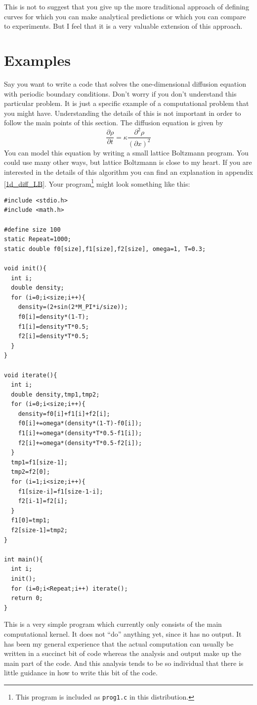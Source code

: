 \documentclass[12pt,letterpaper]{article}
\begin{document}
This is not to suggest that you give up the more traditional approach
of defining curves for which you can make analytical predictions or
which you can compare to experiments. But I feel that it is a very
valuable extension of this approach.

\section{Examples}
Say you want to write a code that solves the one-dimensional diffusion
equation with periodic boundary conditions. Don't worry if you don't
understand this particular problem. It is just a specific example of a
computational problem that you might have. Understanding the details
of this is not important in order to follow the main points of this
section. The diffusion equation is given by
\begin{equation}
\frac{\partial \rho}{\partial t} =
\kappa\frac{\partial^2\rho}{(\partial x)^2}
\end{equation}
You can model this equation by writing a small lattice Boltzmann
program. You could use many other ways, but lattice
Boltzmann is close to my heart. If you are interested in the details
of this algorithm you can find an explanation in appendix
\ref{1d_diff_LB}.  Your program\footnote{This program is included as
\texttt{prog1.c} in this distribution.} might look something like
this:
\begin{verbatim}
#include <stdio.h>
#include <math.h>

#define size 100
static Repeat=1000;
static double f0[size],f1[size],f2[size], omega=1, T=0.3;

void init(){
  int i;
  double density;
  for (i=0;i<size;i++){
    density=(2+sin(2*M_PI*i/size));
    f0[i]=density*(1-T);
    f1[i]=density*T*0.5;
    f2[i]=density*T*0.5;
  }
}

void iterate(){
  int i;
  double density,tmp1,tmp2;
  for (i=0;i<size;i++){
    density=f0[i]+f1[i]+f2[i];
    f0[i]+=omega*(density*(1-T)-f0[i]);
    f1[i]+=omega*(density*T*0.5-f1[i]);
    f2[i]+=omega*(density*T*0.5-f2[i]);
  }
  tmp1=f1[size-1];
  tmp2=f2[0];
  for (i=1;i<size;i++){
    f1[size-i]=f1[size-1-i];
    f2[i-1]=f2[i];
  }
  f1[0]=tmp1;
  f2[size-1]=tmp2;
}

int main(){
  int i;
  init();
  for (i=0;i<Repeat;i++) iterate();
  return 0;
}
\end{verbatim}
This is a very simple program which currently only consists of the
main computational kernel. It does not ``do'' anything yet, since
it has no output. It has been my general experience that the actual
computation can usually be written in a succinct bit of code whereas
the analysis and output make up the main part of the code. And this
analysis tends to be so individual that there is little guidance in
how to write this bit of the code. 
\end{document}
